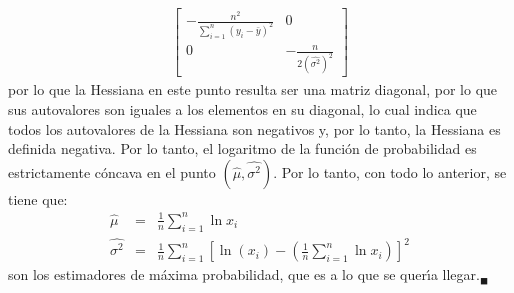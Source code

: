 \begin{solucion}
\begin{enumerate}
\begin{eqnarray*}
   \begin{bmatrix}
    \displaystyle{ -\frac{n^2}{\sum_{i=1}^n \left( y_i - \bar{y} \right)^2 } } & 0 \\
    0 & - \frac{n}{2\left( \widehat{\sigma^2} \right)^2}
   \end{bmatrix}
  \end{eqnarray*}
  por lo que la Hessiana en este punto resulta ser una matriz diagonal, por lo que sus autovalores son iguales a los elementos en su diagonal, lo cual indica que todos los autovalores de la Hessiana son negativos y, por lo tanto, la Hessiana es definida negativa. Por lo tanto, el logaritmo de la funci\'on de probabilidad es estrictamente c\'oncava en el punto $\left( \hat{\mu} , \widehat{\sigma^2} \right)$. Por lo tanto, con todo lo anterior, se tiene que:
  \begin{eqnarray*}
   \hat{\mu} & = & \frac{1}{n} \sum_{i=1}^n \ln x_i \\
   \widehat{\sigma^2} & = & \frac{1}{n} \sum_{i=1}^n \left[ \ln\left( x_i \right) - \left( \frac{1}{n} \sum_{i=1}^n \ln x_i \right) \right]^2
  \end{eqnarray*}
  son los estimadores de m\'axima probabilidad, que es a lo que se quer\'{\i}a llegar.${}_{\blacksquare}$
 \end{enumerate}
\end{solucion}
